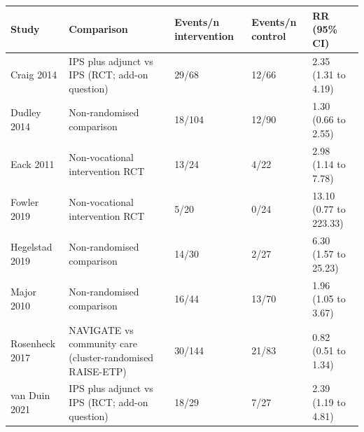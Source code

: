 
\begin{tabular}{lp{5.5cm}llp{2.6cm}}
\toprule
Study & Comparison & Events/n intervention & Events/n control & RR (95\% CI)\\
\midrule
Craig 2014 & IPS plus adjunct vs IPS (RCT; add-on question) & 29/68 & 12/66 & 2.35 (1.31 to 4.19)\\
Dudley 2014 & Non-randomised comparison & 18/104 & 12/90 & 1.30 (0.66 to 2.55)\\
Eack 2011 & Non-vocational intervention RCT & 13/24 & 4/22 & 2.98 (1.14 to 7.78)\\
Fowler 2019 & Non-vocational intervention RCT & 5/20 & 0/24 & 13.10 (0.77 to 223.33)\\
Hegelstad 2019 & Non-randomised comparison & 14/30 & 2/27 & 6.30 (1.57 to 25.23)\\
Major 2010 & Non-randomised comparison & 16/44 & 13/70 & 1.96 (1.05 to 3.67)\\
Rosenheck 2017 & NAVIGATE vs community care (cluster-randomised RAISE-ETP) & 30/144 & 21/83 & 0.82 (0.51 to 1.34)\\
van Duin 2021 & IPS plus adjunct vs IPS (RCT; add-on question) & 18/29 & 7/27 & 2.39 (1.19 to 4.81)\\
\bottomrule
\end{tabular}
